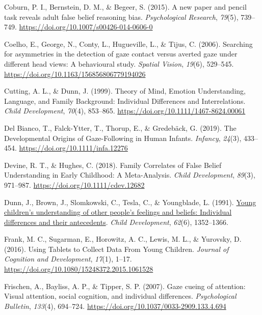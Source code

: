 \documentclass[
  man,floatsintext]{apa7}
\newlength{\cslhangindent}
\newlength{\cslentryspacingunit} %
\newenvironment{CSLReferences}[2] %
 {%
  \setlength{\parindent}{0pt}
  \ifodd #1
  \let\oldpar\par
  \def\par{\hangindent=\cslhangindent\oldpar}
  \fi
  \setlength{\parskip}{#2\cslentryspacingunit}
 }%
 {}
\begin{document}
\begin{CSLReferences}{1}{0}
\leavevmode{}%
Coburn, P. I., Bernstein, D. M., \& Begeer, S. (2015). A new paper and pencil task reveals adult false belief reasoning bias. \emph{Psychological Research}, \emph{79}(5), 739--749. \url{https://doi.org/10.1007/s00426-014-0606-0}

\leavevmode{}%
Coelho, E., George, N., Conty, L., Hugueville, L., \& Tijus, C. (2006). Searching for asymmetries in the detection of gaze contact versus averted gaze under different head views: A behavioural study. \emph{Spatial Vision}, \emph{19}(6), 529--545. \url{https://doi.org/10.1163/156856806779194026}

\leavevmode{}%
Cutting, A. L., \& Dunn, J. (1999). Theory of {Mind}, {Emotion Understanding}, {Language}, and {Family Background}: {Individual Differences} and {Interrelations}. \emph{Child Development}, \emph{70}(4), 853--865. \url{https://doi.org/10.1111/1467-8624.00061}

\leavevmode{}%
Del Bianco, T., Falck-Ytter, T., Thorup, E., \& Gredebäck, G. (2019). The {Developmental Origins} of {Gaze-Following} in {Human Infants}. \emph{Infancy}, \emph{24}(3), 433--454. \url{https://doi.org/10.1111/infa.12276}

\leavevmode{}%
Devine, R. T., \& Hughes, C. (2018). Family {Correlates} of {False Belief Understanding} in {Early Childhood}: {A Meta-Analysis}. \emph{Child Development}, \emph{89}(3), 971--987. \url{https://doi.org/10.1111/cdev.12682}

\leavevmode{}%
Dunn, J., Brown, J., Slomkowski, C., Tesla, C., \& Youngblade, L. (1991). \href{https://www.ncbi.nlm.nih.gov/pubmed/1786720}{Young children's understanding of other people's feelings and beliefs: Individual differences and their antecedents}. \emph{Child Development}, \emph{62}(6), 1352--1366.

\leavevmode{}%
Frank, M. C., Sugarman, E., Horowitz, A. C., Lewis, M. L., \& Yurovsky, D. (2016). Using {Tablets} to {Collect Data From Young Children}. \emph{Journal of Cognition and Development}, \emph{17}(1), 1--17. \url{https://doi.org/10.1080/15248372.2015.1061528}

\leavevmode{}%
Frischen, A., Bayliss, A. P., \& Tipper, S. P. (2007). Gaze cueing of attention: {Visual} attention, social cognition, and individual differences. \emph{Psychological Bulletin}, \emph{133}(4), 694--724. \url{https://doi.org/10.1037/0033-2909.133.4.694}


\end{CSLReferences}
\end{document}
